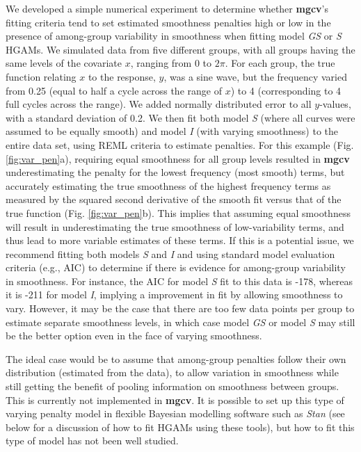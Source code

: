 \documentclass[12pt]{article}
\begin{document}
We developed a simple numerical experiment to determine whether
\textbf{mgcv}'s fitting criteria tend to set estimated smoothness
penalties high or low in the presence of among-group variability in
smoothness when fitting model \emph{GS} or \emph{S} HGAMs. We simulated
data from five different groups, with all groups having the same levels
of the covariate \(x\), ranging from 0 to \(2\pi\). For each group, the
true function relating \(x\) to the response, \(y\), was a sine wave,
but the frequency varied from 0.25 (equal to half a cycle across the
range of \(x\)) to 4 (corresponding to 4 full cycles across the range).
We added normally distributed error to all \(y\)-values, with a standard
deviation of 0.2. We then fit both model \emph{S} (where all curves were
assumed to be equally smooth) and model \emph{I} (with varying
smoothness) to the entire data set, using REML criteria to estimate
penalties. For this example (Fig. \ref{fig:var_pen}a), requiring equal
smoothness for all group levels resulted in \textbf{mgcv}
underestimating the penalty for the lowest frequency (most smooth)
terms, but accurately estimating the true smoothness of the highest
frequency terms as measured by the squared second derivative of the
smooth fit versus that of the true function (Fig. \ref{fig:var_pen}b).
This implies that assuming equal smoothness will result in
underestimating the true smoothness of low-variability terms, and thus
lead to more variable estimates of these terms. If this is a potential
issue, we recommend fitting both models \emph{S} and \emph{I} and using
standard model evaluation criteria (e.g., AIC) to determine if there is
evidence for among-group variability in smoothness. For instance, the
AIC for model \emph{S} fit to this data is -178, whereas it is -211 for
model \emph{I}, implying a improvement in fit by allowing smoothness to
vary. However, it may be the case that there are too few data points per
group to estimate separate smoothness levels, in which case model
\emph{GS} or model \emph{S} may still be the better option even in the
face of varying smoothness.

The ideal case would be to assume that among-group penalties follow
their own distribution (estimated from the data), to allow variation in
smoothness while still getting the benefit of pooling information on
smoothness between groups. This is currently not implemented in
\textbf{mgcv}. It is possible to set up this type of varying penalty
model in flexible Bayesian modelling software such as \emph{Stan} (see
below for a discussion of how to fit HGAMs using these tools), but how
to fit this type of model has not been well studied.
\end{document}
